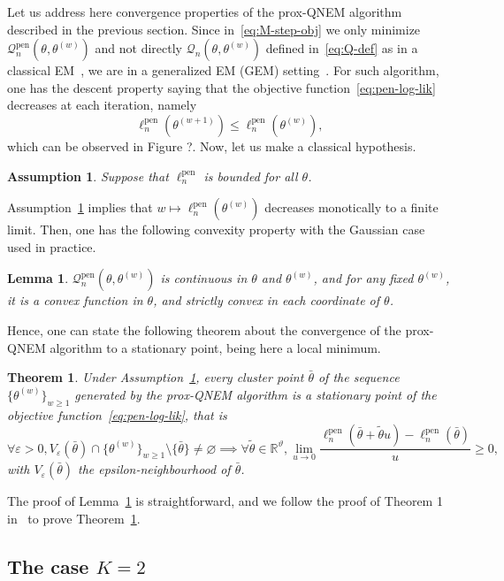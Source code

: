\documentclass[11pt]{article}
\newtheorem{assumption}{Assumption}{\bf}{\rm}
\newtheorem{lemma}{Lemma}
\newtheorem{theorem}{Theorem}
\newcommand{\cQ}{\mathcal Q}
\newcommand{\R}{\mathds R}
\begin{document}
Let us address here convergence properties of the prox-QNEM algorithm described in the previous section. Since in~\eqref{eq:M-step-obj} we only minimize $\cQ_n^\text{pen}(\theta, \theta^{(w)})$ and not directly $\cQ_n(\theta, \theta^{(w)})$ defined in~\eqref{eq:Q-def} as in a classical EM~\citep{wu1983convergence}, we are in a generalized EM (GEM) setting~\citep{dempster1977maximum}. For such algorithm, one has the descent property saying that the objective function~\eqref{eq:pen-log-lik} decreases at each iteration, namely 
\[\ell^{\text{pen}}_n(\theta^{(w+1)}) \leq \ell^{\text{pen}}_n(\theta^{(w)}),\]
which can be observed in Figure ?.
Now, let us make a classical hypothesis.
\begin{assumption}
  \label{hyp:bounded}
  Suppose that $\ell^{\text{pen}}_n$ is bounded for all $\theta$.
\end{assumption}
Assumption~\ref{hyp:bounded} implies that $w \mapsto \ell^{\text{pen}}_n(\theta^{(w)})$ decreases monotically to a finite limit. Then, one has the following convexity property with the Gaussian case used in practice.
\begin{lemma}
\label{lem:strictly-convex}
$\cQ_n^{\text{pen}}(\theta, \theta^{(w)})$ is continuous in $\theta$ and $\theta^{(w)}$, and for any fixed $\theta^{(w)}$, it is a convex function in $\theta$, and strictly convex in each coordinate of $\theta$.
\end{lemma}
Hence, one can state the following theorem about the convergence of the prox-QNEM algorithm to a stationary point, being here a local minimum.
\begin{theorem}
\label{th:cvg}
Under Assumption~\ref{hyp:bounded}, every cluster point $\bar{\theta}$ of the sequence $\{ \theta^{(w)}\}_{w \geq 1}$ generated by the prox-QNEM algorithm is a stationary point of the objective function~\eqref{eq:pen-log-lik}, that is
\[\forall \varepsilon > 0, V_\varepsilon(\bar{\theta}) \cap \{ \theta^{(w)}\}_{w \geq 1} \setminus \{\bar{\theta}\} \neq \varnothing \implies \forall \tilde \theta \in \R^\vartheta, \underset{u \rightarrow 0}{\lim} \frac{\ell^{\text{pen}}_n(\bar{\theta} + \tilde \theta u) - \ell^{\text{pen}}_n(\bar{\theta})}{u} \geq 0 ,\]
with $V_\varepsilon(\bar{\theta})$ the epsilon-neighbourhood of $\bar{\theta}$.
\end{theorem}
The proof of Lemma~\ref{lem:strictly-convex} is straightforward, and we follow the proof of Theorem 1 in~\citet{bussy2019c} to prove Theorem~\ref{th:cvg}.

\subsection{The case $K=2$}
\label{sec:K=2}
\end{document}
